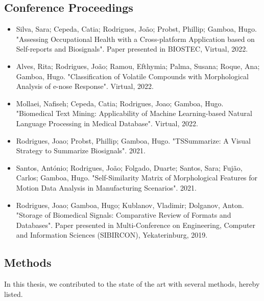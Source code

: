 \subsection{Conference Proceedings}

\begin{itemize}

\item Silva, Sara; Cepeda, Catia; Rodrigues, João; Probst, Phillip; Gamboa, Hugo. "Assessing Occupational Health with a Cross-platform Application based on Self-reports and Biosignals". Paper presented in BIOSTEC, Virtual, 2022.

\item Alves, Rita; Rodrigues, João; Ramou, Efthymia; Palma, Susana; Roque, Ana; Gamboa, Hugo. "Classification of Volatile Compounds with Morphological Analysis of e-nose Response". Virtual, 2022.

\item Mollaei, Nafiseh; Cepeda, Catia; Rodrigues, Joao; Gamboa, Hugo. "Biomedical Text Mining: Applicability of Machine Learning-based Natural Language Processing in Medical Database". Virtual, 2022.

\item Rodrigues, Joao; Probst, Phillip; Gamboa, Hugo. "TSSummarize: A Visual Strategy to Summarize Biosignals". 2021.

\item Santos, António; Rodrigues, João; Folgado, Duarte; Santos, Sara; Fujão, Carlos; Gamboa, Hugo. "Self-Similarity Matrix of Morphological Features for Motion Data Analysis in Manufacturing Scenarios". 2021.

\item Rodrigues, Joao; Gamboa, Hugo; Kublanov, Vladimir; Dolganov, Anton. "Storage of Biomedical Signals: Comparative Review of Formats and Databases". Paper presented in Multi-Conference on Engineering, Computer and Information Sciences (SIBIRCON), Yekaterinburg, 2019.

\end{itemize}

\subsection{Methods}

In this thesis, we contributed to the state of the art with several methods, hereby listed.

